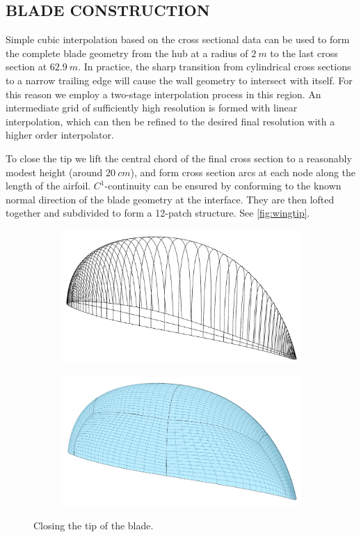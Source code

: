 \documentclass{nordic}
\begin{document}
\subsection{BLADE CONSTRUCTION}

Simple cubic interpolation based on the cross sectional data can be used to form the complete blade
geometry from the hub at a radius of $\SI{2}{m}$ to the last cross section at $\SI{62.9}{m}$.  In
practice, the sharp transition from cylindrical cross sections to a narrow trailing edge will cause
the wall geometry to intersect with itself.  For this reason we employ a two-stage interpolation
process in this region.  An intermediate grid of sufficiently high resolution is formed with linear
interpolation, which can then be refined to the desired final resolution with a higher order
interpolator.

To close the tip we lift the central chord of the final cross section to a reasonably modest height
(around $\SI{20}{cm}$), and form cross section arcs at each node along the length of the
airfoil. $C^1$-continuity can be ensured by conforming to the known normal direction of the blade
geometry at the interface.  They are then lofted together and subdivided to form a 12-patch
structure.  See \autoref{fig:wingtip}.

\begin{figure}
  \centering
  \begin{subfigure}[b]{0.40\textwidth}
    \includegraphics[width=\textwidth]{figs/wingtip-skeleton}
  \end{subfigure}
  \begin{subfigure}[b]{0.40\textwidth}
    \includegraphics[width=\textwidth]{figs/wingtip-full}
  \end{subfigure}
  \caption{Closing the tip of the blade.}
  \label{fig:wingtip}
\end{figure}
\end{document}
